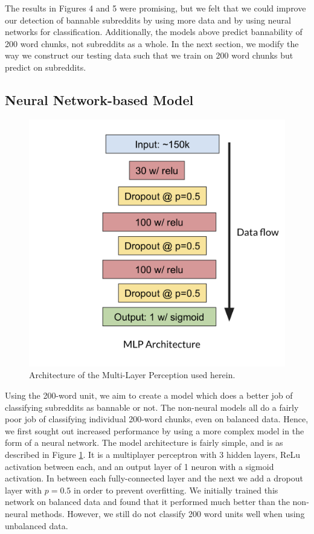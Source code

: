 \documentclass[11pt]{article}[twocolumn]
\begin{document}
The results in Figures 4 and 5 were promising, but we felt that we could improve our detection of bannable subreddits by using more data and by using neural networks for classification.  Additionally, the models above predict bannability of 200 word chunks, not subreddits as a whole.  In the next section, we modify the way we construct our testing data such that we train on 200 word chunks but predict on subreddits.

\subsection{Neural Network-based Model}

\begin{figure}
    \centering
    \includegraphics[width=0.55\linewidth]{MLP_Architecture.png}
    \caption{Architecture of the Multi-Layer Perception used herein.}
    \label{fig:MLP_Architecture}
\end{figure}

Using the 200-word unit, we aim to create a model which does a better job of classifying subreddits as bannable or not. The non-neural models all do a fairly poor job of classifying individual 200-word chunks, even on balanced data. Hence, we first sought out increased performance by using a more complex model in the form of a neural network. The model architecture is fairly simple, and is as described in Figure \ref{fig:MLP_Architecture}. It is a multiplayer perceptron with 3 hidden layers, ReLu activation between each, and an output layer of 1 neuron with a sigmoid activation. In between each fully-connected layer and the next we add a dropout layer with $p=0.5$ in order to prevent overfitting. We initially trained this network on balanced data and found that it performed much better than the non-neural methods. However, we still do not classify 200 word units well when using unbalanced data.
\end{document}
